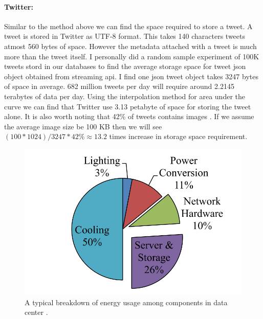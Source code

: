 \paragraph{Twitter:}
Similar to the method above we can find the space required to store a tweet. A tweet is stored in Twitter as UTF-8 format. This takes 140 characters tweets atmost 560 bytes of space. However the metadata attached with a tweet is much more than the tweet itself. I personally did a random sample experiment of 100K tweets stord in our databases to find the average storage space for tweet json object obtained from streaming api. I find one json tweet object takes 3247 bytes of space in average.
682 million tweets per day will require around 2.2145 terabytes of data per day. Using the interpolation method for area under the curve we can find that Twitter use 3.13 petabyte of space for storing the tweet alone. It is also worth noting that 42\% of tweets contains images \cite{tweets_images}. If we assume the average image size be 100 KB then we will see $(100 * 1024)/3247 * 42 \% \approx 13.2$ times increase in storage space requirement.

\begin{figure}[t]
	\includegraphics[width=0.7\linewidth ]{fig/energy_usage.png}
    \vspace{-2mm}
    \caption{A typical breakdown of energy usage among components in data center \cite{info2007top}.}
    \label{fig:energy_usage}
\end{figure}

